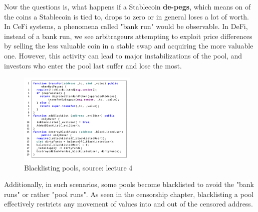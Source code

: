 \documentclass{article}
\begin{document}
Now the questions is, what happens if a Stablecoin \textbf{de-pegs}, which means on of the coins a Stablecoin is tied to, drops to zero or in general loses a lot of worth. In CeFi systems, a phenomena called "bank run" would be observable. In DeFi, instead of a bank run, we see arbitrageurs attempting to exploit price differences by selling the less valuable coin in a stable swap and acquiring the more valuable one. However, this activity can lead to major instabilizations of the pool, and investors who enter the pool last suffer and lose the most. \begin{figure}[h]
    \centering
    \includegraphics[width=0.5\textwidth]{Bildschirmfoto 2024-04-02 um 16.33.28.png} %
    \caption{Blacklisting pools, \scriptsize{source: lecture 4}}
    \label{fig:DoS-attack}
\end{figure} Additionally, in such scenarios, some pools become blacklisted to avoid the "bank runs" or rather "pool runs". As seen in the censorship chapter, blacklisting a pool effectively restricts any movement of values into and out of the censored address.
\end{document}
